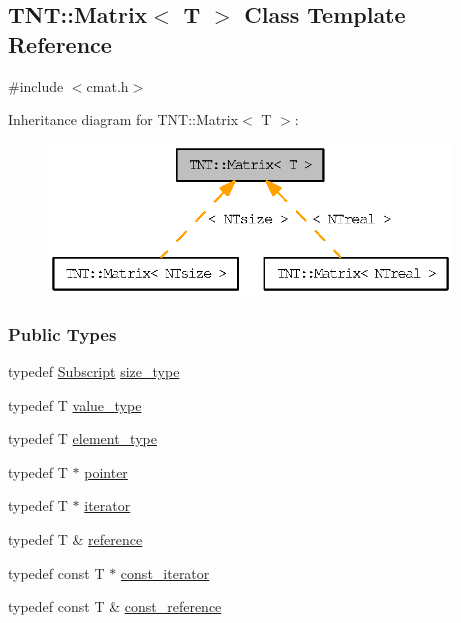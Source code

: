 \subsection{TNT::Matrix$<$ T $>$ Class Template Reference}
\label{class_t_n_t_1_1_matrix}


{\ttfamily \#include $<$cmat.h$>$}



Inheritance diagram for TNT::Matrix$<$ T $>$:
\nopagebreak
\begin{figure}[H]
\begin{center}
\leavevmode
\includegraphics[width=304pt]{class_t_n_t_1_1_matrix__inherit__graph}
\end{center}
\end{figure}
\subsubsection*{Public Types}
\begin{DoxyCompactItemize}
\item 
typedef \hyperlink{namespace_t_n_t_af22e3f1460e145c04ce4e7d701e4c1c1}{Subscript} \hyperlink{class_t_n_t_1_1_matrix_a42f57fd19de0ba2edce3734f41431727}{size\_\-type}
\item 
typedef T \hyperlink{class_t_n_t_1_1_matrix_a869b1a3e56a38bdaeb0b4f698b08e3c5}{value\_\-type}
\item 
typedef T \hyperlink{class_t_n_t_1_1_matrix_a8ecf0a648bbfaf636fd78c21b35a0a4d}{element\_\-type}
\item 
typedef T $\ast$ \hyperlink{class_t_n_t_1_1_matrix_aa7db7adc5513f7d8bf067965b97d7c42}{pointer}
\item 
typedef T $\ast$ \hyperlink{class_t_n_t_1_1_matrix_a8233a1d03d4cfeab1d7cfec560cd2f0c}{iterator}
\item 
typedef T \& \hyperlink{class_t_n_t_1_1_matrix_a129951783800dd85d3dcc1f6dd2062f9}{reference}
\item 
typedef const T $\ast$ \hyperlink{class_t_n_t_1_1_matrix_a39334142ce0b5ee917e7b222a6b5637b}{const\_\-iterator}
\item 
typedef const T \& \hyperlink{class_t_n_t_1_1_matrix_a6d3ceefbf1675aad4acadac4f78ed04b}{const\_\-reference}
\end{DoxyCompactItemize}
